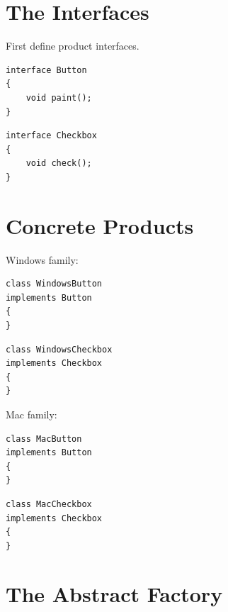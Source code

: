 \documentclass[11pt,a4paper]{book}
\begin{document}
\section{The Interfaces}

First define product interfaces.


\begin{verbatim}
interface Button
{
    void paint();
}
\end{verbatim}


\begin{verbatim}
interface Checkbox
{
    void check();
}
\end{verbatim}


\section{Concrete Products}

Windows family:

\begin{verbatim}
class WindowsButton
implements Button
{
}
\end{verbatim}

\begin{verbatim}
class WindowsCheckbox
implements Checkbox
{
}
\end{verbatim}


Mac family:

\begin{verbatim}
class MacButton
implements Button
{
}
\end{verbatim}

\begin{verbatim}
class MacCheckbox
implements Checkbox
{
}
\end{verbatim}

\section{The Abstract Factory}
\end{document}
